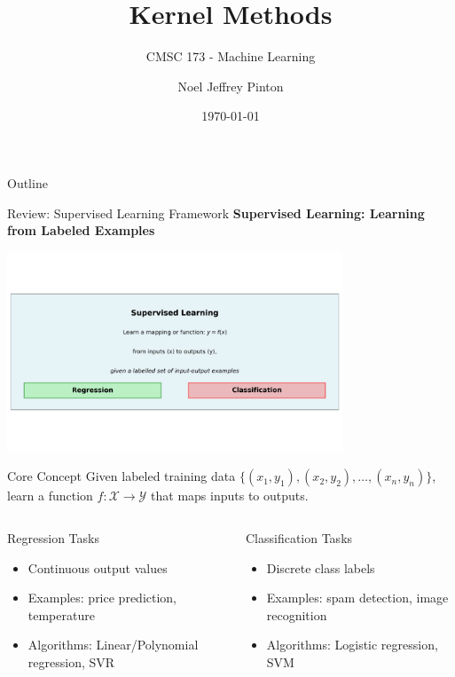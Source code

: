 \documentclass[8pt,aspectratio=1610]{beamer}
\title{Kernel Methods}
\subtitle{CMSC 173 - Machine Learning}
\author{Noel Jeffrey Pinton}
\institute{Department of Computer Science\\University of the Philippines - Cebu}
\date{\today}
\begin{document}
\begin{frame}
\titlepage
\end{frame}

\begin{frame}{Outline}
\tableofcontents
\end{frame}

\begin{frame}{Review: Supervised Learning Framework}
\centering
\textbf{Supervised Learning: Learning from Labeled Examples}
\vspace{0.3cm}

\includegraphics[width=0.75\textwidth]{../figures/supervised_learning_overview.png}

\vspace{0.3cm}
\begin{block}{Core Concept}
Given labeled training data $\{(x_1, y_1), (x_2, y_2), \ldots, (x_n, y_n)\}$, learn a function $f: \mathcal{X} \to \mathcal{Y}$ that maps inputs to outputs.
\end{block}

\begin{columns}[t]
\begin{column}{0.48\textwidth}
\begin{block}{Regression Tasks}
\begin{itemize}
\setlength{\itemsep}{1pt}
\item Continuous output values
\item Examples: price prediction, temperature
\item Algorithms: Linear/Polynomial regression, SVR
\end{itemize}
\end{block}
\end{column}

\begin{column}{0.48\textwidth}
\begin{block}{Classification Tasks}
\begin{itemize}
\setlength{\itemsep}{1pt}
\item Discrete class labels
\item Examples: spam detection, image recognition
\item Algorithms: Logistic regression, SVM
\end{itemize}
\end{block}
\end{column}
\end{columns}
\end{frame}
\end{document}
